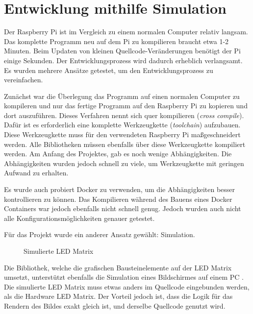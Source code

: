 

\section{Entwicklung mithilfe Simulation}
Der Raspberry Pi ist im Vergleich zu einem normalen Computer relativ langsam. Das komplette Programm neu auf dem Pi zu kompilieren braucht etwa 1-2 Minuten. Beim Updaten von kleinen Quellcode-Veränderungen benötigt der Pi einige Sekunden. Der Entwicklungsprozess wird dadurch erheblich verlangsamt. Es wurden mehrere Ansätze getestet, um den Entwicklungsprozess zu vereinfachen.

Zunächst war die Überlegung das Programm auf einen normalen Computer zu kompileren und nur das fertige Programm auf den Raspberry Pi zu kopieren und dort auszuführen. Dieses Verfahren nennt sich quer kompilieren (\emph{cross compile}). Dafür ist es erforderlich eine komplette Werkzeugkette (\emph{toolchain}) aufzubauen. Diese Werkzeugkette muss für den verwendeten Raspberry Pi maßgeschneidert werden. Alle Bibliotheken müssen ebenfalls über diese Werkzeugkette kompiliert werden. Am Anfang des Projektes, gab es noch wenige Abhängigkeiten. Die Abhängigkeiten wurden jedoch schnell zu viele, um Werkzeugkette mit geringen Aufwand zu erhalten.

Es wurde auch probiert Docker zu verwenden, um die Abhängigkeiten besser kontrollieren zu können. Das Kompilieren während des Bauens eines Docker Containers war jedoch ebenfalls nicht schnell genug. Jedoch wurden auch nicht alle Konfigurationsmöglichkeiten genauer getestet.
	
Für das Projekt wurde ein anderer Ansatz gewählt: Simulation.

\begin{figure}[H]
	\centering
	\caption{Simulierte LED Matrix \cite{githubEmbedded-graphicsSimulator}}
\end{figure}


Die Bibliothek, welche die grafischen Bausteinelemente auf der LED Matrix umsetzt, unterstützt ebenfalls die Simulation eines Bildschirmes auf einem PC \cite{githubEmbedded-graphicsSimulator}. Die simulierte LED Matrix muss etwas anders im Quellcode eingebunden werden, als die Hardware LED Matrix. Der Vorteil jedoch ist, dass die Logik für das Rendern des Bildes exakt gleich ist, und derselbe Quellcode genutzt wird.

